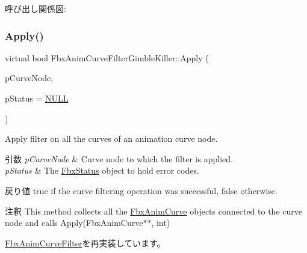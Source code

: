 呼び出し関係図\+:
\mbox{\label{class_fbx_anim_curve_filter_gimble_killer_adb147695af2818ccc71e245170d05e78}} 
\subsubsection{\texorpdfstring{Apply()}{Apply()}\hspace{0.1cm}{\footnotesize\ttfamily [3/5]}}
{\footnotesize\ttfamily virtual bool Fbx\+Anim\+Curve\+Filter\+Gimble\+Killer\+::\+Apply (\begin{DoxyParamCaption}\item[{\hyperlink{class_fbx_anim_curve_node}{Fbx\+Anim\+Curve\+Node} \&}]{p\+Curve\+Node,  }\item[{\hyperlink{class_fbx_status}{Fbx\+Status} $\ast$}]{p\+Status = {\ttfamily \hyperlink{fbxarch_8h_a070d2ce7b6bb7e5c05602aa8c308d0c4}{N\+U\+LL}} }\end{DoxyParamCaption})\hspace{0.3cm}{\ttfamily [virtual]}}

Apply filter on all the curves of an animation curve node. 
\begin{DoxyParams}{引数}
{\em p\+Curve\+Node} & Curve node to which the filter is applied. \\
\hline
{\em p\+Status} & The \hyperlink{class_fbx_status}{Fbx\+Status} object to hold error codes. \\
\hline
\end{DoxyParams}
\begin{DoxyReturn}{戻り値}
{\ttfamily true} if the curve filtering operation was successful, {\ttfamily false} otherwise. 
\end{DoxyReturn}
\begin{DoxyRemark}{注釈}
This method collects all the \hyperlink{class_fbx_anim_curve}{Fbx\+Anim\+Curve} objects connected to the curve node and calls Apply(\+Fbx\+Anim\+Curve$\ast$$\ast$, int) 
\end{DoxyRemark}


\hyperlink{class_fbx_anim_curve_filter_ad042b45c0675278fa49e61739b0825c2}{Fbx\+Anim\+Curve\+Filter}を再実装しています。

\mbox{\label{class_fbx_anim_curve_filter_gimble_killer_a1c2012cdf59a163a816726f973c2c067}} 
